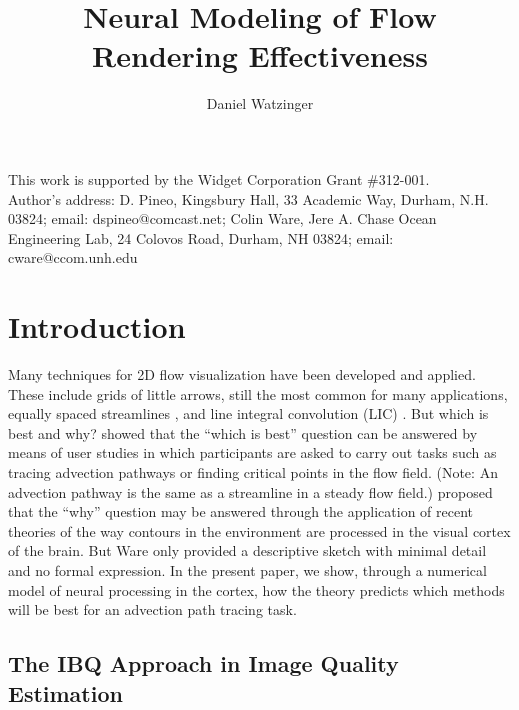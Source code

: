 \documentclass[prodmode,acmtap]{acmlarge}
\title{Neural Modeling of Flow Rendering Effectiveness}
\author{Daniel Watzinger \affil{University of Passau}}
\begin{document}
\begin{bottomstuff}
This work is supported by the Widget Corporation Grant \#312-001.\\
Author's address: D. Pineo, Kingsbury Hall, 33 Academic Way, Durham,
N.H. 03824; email: dspineo@comcast.net; Colin Ware, Jere A. Chase
Ocean Engineering Lab, 24 Colovos Road, Durham, NH 03824; email: cware@ccom.unh.edu
\end{bottomstuff}
\maketitle

\section{Introduction}

Many techniques for 2D flow visualization have been developed and
applied. These include grids of little arrows, still the most common
for many applications, equally spaced streamlines
\cite{Turk1996,Jobard1997}, and line integral convolution (LIC)
\cite{Cabral1993}. But which is best and why? 
showed that the ``which is best'' question can be answered by means
of user studies in which participants are asked to carry out tasks
such as tracing advection pathways or finding critical points in the
flow field. (Note: An advection pathway is the same as a streamline
in a steady flow field.)  proposed that the ``why''
question may be answered through the application of recent theories
of the way contours in the environment are processed in the visual
cortex of the brain. But Ware only provided a descriptive sketch
with minimal detail and no formal expression. In the present paper,
we show, through a numerical model of neural processing in the
cortex, how the theory predicts which methods will be best for an
advection path tracing task.

\subsection{The IBQ Approach in Image Quality Estimation}
\end{document}
